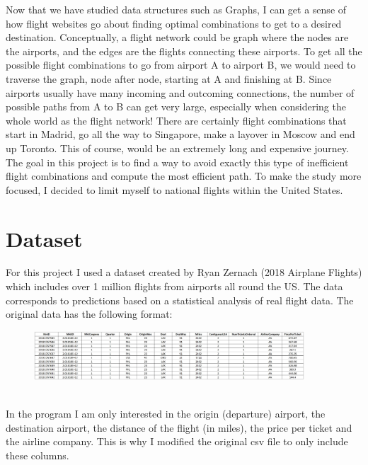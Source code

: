 \documentclass[fontsize=11pt]{article}
\begin{document}
\noindent
Now that we have studied data structures such as Graphs, I can get a sense of how flight websites go about finding optimal combinations to get to a desired destination. Conceptually, a flight network could be graph where the nodes are the airports, and the edges are the flights connecting these airports. To get all the possible flight combinations to go from airport A to airport B, we would need to traverse the graph, node after node, starting at A and finishing at B. Since airports usually have many incoming and outcoming connections, the number of possible paths from A to B can get very large, especially when considering the whole world as the flight network! There are certainly flight combinations that start in Madrid, go all the way to Singapore, make a layover in Moscow and end up Toronto. This of course, would be an extremely long and expensive journey. The goal in this project is to find a way to avoid exactly this type of inefficient flight combinations and compute the most efficient path. To make the study more focused, I decided to limit myself to national flights within the United States.


\section*{Dataset}

\noindent
For this project I used a dataset created by Ryan Zernach (2018 Airplane Flights) which includes over 1 million flights from airports all round the US. The data corresponds to predictions based on a statistical analysis of real flight data. The original data has the following format:\\

\begin{figure}
    \includegraphics[width=0.9\textwidth]{table1.jpg}
\end{figure} \\

\noindent
In the program I am only interested in the origin (departure) airport, the destination airport, the distance of the flight (in miles), the price per ticket and the airline company. This is why I modified the original csv file to only include these columns.\\
\end{document}
